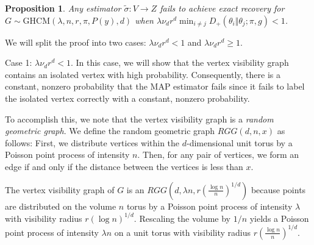 \documentclass{article}
\newcommand{\1}{\mathbbm{1}}
\theoremstyle{definition}
\theoremstyle{plain}
\newtheorem{prop}{Proposition}
\begin{document}
\begin{prop}
\label{prop:impossibility_proof_1}
    Any estimator $\tilde{\sigma}: V \to Z$ fails to achieve exact recovery for $G \sim \text{GHCM}(\lambda, n, r, \pi, P(y), d)$ when $\lambda \nu_d r^d \min_{i \neq j} D_+(\theta_i \Vert \theta_j; \pi, g) < 1$.
\end{prop}
We will split the proof into two cases: $\lambda \nu_d r^d < 1$ and $\lambda \nu_d r^d \geq 1$.

Case 1: $\lambda \nu_d r^d < 1$. In this case, we will show that the vertex visibility graph contains an isolated vertex with high probability. Consequently, there is a constant, nonzero probability that the MAP estimator fails since it fails to label the isolated vertex correctly with a constant, nonzero probability.

To accomplish this, we note that the vertex visibility graph is a \textit{random geometric graph}. We define the random geometric graph $RGG(d, n, x)$ as follows: First, we distribute vertices within the $d$-dimensional unit torus by a Poisson point process of intensity $n$. Then, for any pair of vertices, we form an edge if and only if the distance between the vertices is less than $x$. 

The vertex visibility graph of $G$ is an $RGG(d, \lambda n, r(\frac{\log n}{n})^{1/d})$ because points are distributed on the volume $n$ torus by a Poisson point process of intensity $\lambda$ with visibility radius $r(\log n)^{1/d}$. Rescaling the volume by $1/n$ yields a Poisson point process of intensity $\lambda n$ on a unit torus with visibility radius $r(\frac{\log n}{n})^{1/d}$.
\end{document}
